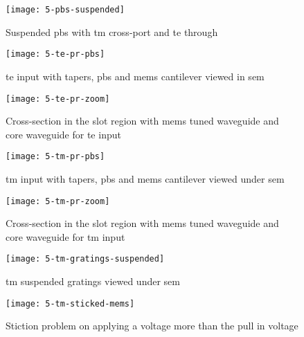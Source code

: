 \documentclass[../report.tex]{subfiles}
\begin{document}
\begin{figure}[H] %
	\centering
	\texttt{[image: 5-pbs-suspended]}
	\caption{Suspended \gls{pbs} with \gls{tm} cross-port and \gls{te} through}
	\label{fig:5-pbs-suspended}
\end{figure}

\begin{figure}[H] %
	\centering
	\texttt{[image: 5-te-pr-pbs]}
	\caption{\gls{te} input with tapers, \gls{pbs} and \gls{mems} cantilever viewed in \gls{sem}}
	\label{fig:5_te_pr_pbs}
\end{figure}

\begin{figure}[H] %
	\centering
	\texttt{[image: 5-te-pr-zoom]}
	\caption{Cross-section in the slot region with \gls{mems} tuned waveguide and core waveguide for \gls{te} input}
	\label{fig:5_te_pr_zoom}
\end{figure}

\begin{figure}[H] %
	\centering
	\texttt{[image: 5-tm-pr-pbs]}
	\caption{\gls{tm} input with tapers, \gls{pbs} and \gls{mems} cantilever viewed under \gls{sem}}
	\label{fig:5_tm_pr_pbs}
\end{figure}

\begin{figure}[H] %
	\centering
	\texttt{[image: 5-tm-pr-zoom]}
	\caption{Cross-section in the slot region with \gls{mems} tuned waveguide and core waveguide for \gls{tm} input}
	\label{fig:5_tm_pr_zoom}
\end{figure}

\begin{figure}[h] %
	\centering
	\texttt{[image: 5-tm-gratings-suspended]}
	\caption{\gls{tm} suspended gratings viewed under \gls{sem}}
	\label{fig:5_tm_gratings_suspended}
\end{figure}

\begin{figure}[h] %
	\centering
	\texttt{[image: 5-tm-sticked-mems]}
	\caption{Stiction problem on applying a voltage more than the pull in voltage}
	\label{fig:5_tm_sticked_mems}
\end{figure}
\end{document}
